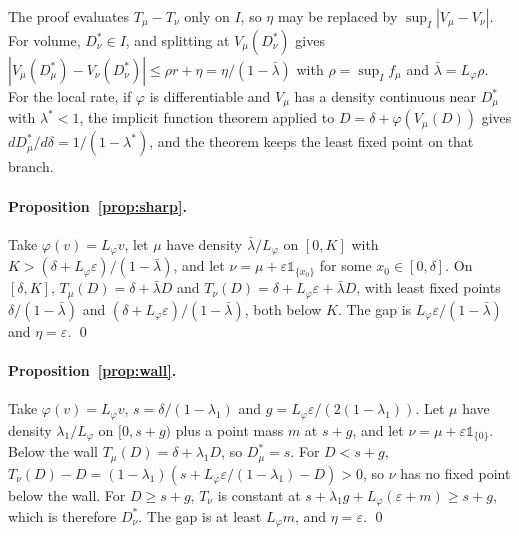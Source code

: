 \documentclass[letterpaper]{article} %
\theoremstyle{remark}
\newcommand{\Dstar}[1]{D^{\ast}_{#1}}
\newcommand{\Lp}{L_\varphi}
\newcommand{\lb}{\bar\lambda}
\begin{document}
The proof evaluates $T_\mu-T_\nu$ only on $I$, so $\eta$ may be replaced by $\sup_I|V_\mu-V_\nu|$. For volume, $\Dstar{\nu}\in I$, and splitting at $V_\mu(\Dstar{\nu})$ gives $|V_\mu(\Dstar{\mu})-V_\nu(\Dstar{\nu})|\le\rho r+\eta=\eta/(1-\lb)$ with $\rho=\sup_I f_\mu$ and $\lb=\Lp\rho$. For the local rate, if $\varphi$ is differentiable and $V_\mu$ has a density continuous near $\Dstar{\mu}$ with $\lambda^\ast<1$, the implicit function theorem applied to $D=\delta+\varphi(V_\mu(D))$ gives $d\Dstar{\mu}/d\delta=1/(1-\lambda^\ast)$, and the theorem keeps the least fixed point on that branch.

\paragraph{Proposition~\ref{prop:sharp}.} Take $\varphi(v)=\Lp v$, let $\mu$ have density $\lb/\Lp$ on $[0,K]$ with $K>(\delta+\Lp\varepsilon)/(1-\lb)$, and let $\nu=\mu+\varepsilon\mathbb{1}_{\{x_0\}}$ for some $x_0\in[0,\delta]$. On $[\delta,K]$, $T_\mu(D)=\delta+\lb D$ and $T_\nu(D)=\delta+\Lp\varepsilon+\lb D$, with least fixed points $\delta/(1-\lb)$ and $(\delta+\Lp\varepsilon)/(1-\lb)$, both below $K$. The gap is $\Lp\varepsilon/(1-\lb)$ and $\eta=\varepsilon$. \qed

\paragraph{Proposition~\ref{prop:wall}.} Take $\varphi(v)=\Lp v$, $s=\delta/(1-\lambda_1)$ and $g=\Lp\varepsilon/(2(1-\lambda_1))$. Let $\mu$ have density $\lambda_1/\Lp$ on $[0,s+g)$ plus a point mass $m$ at $s+g$, and let $\nu=\mu+\varepsilon\mathbb{1}_{\{0\}}$. Below the wall $T_\mu(D)=\delta+\lambda_1 D$, so $\Dstar{\mu}=s$. For $D<s+g$, $T_\nu(D)-D=(1-\lambda_1)(s+\Lp\varepsilon/(1-\lambda_1)-D)>0$, so $\nu$ has no fixed point below the wall. For $D\ge s+g$, $T_\nu$ is constant at $s+\lambda_1g+\Lp(\varepsilon+m)\ge s+g$, which is therefore $\Dstar{\nu}$. The gap is at least $\Lp m$, and $\eta=\varepsilon$. \qed
\end{document}
